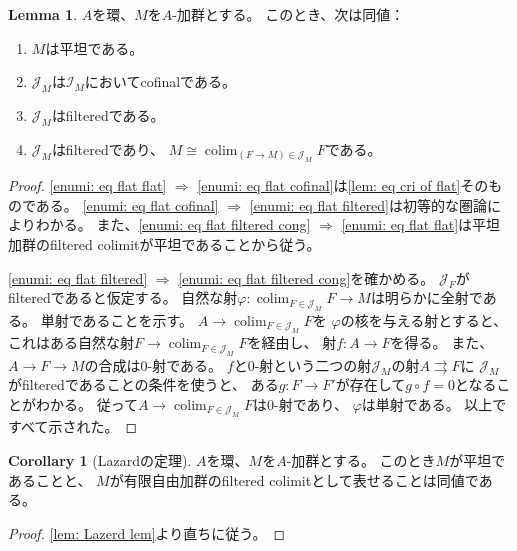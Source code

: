 \documentclass[uplatex]{jsarticle}
\theoremstyle{definition}
\newtheorem{cor}[cor]{Corollary}
\newtheorem{lem}[lem]{Lemma}
\DeclareMathOperator{\colim}{\mathrm{colim}}
\newcommand{\mcI}{\mathcal{I}}
\newcommand{\mcJ}{\mathcal{J}}
\begin{document}
\begin{lem}\label{lem: Lazerd lem}
  \(A\)を環、\(M\)を\(A\)-加群とする。
  このとき、次は同値：
  \begin{enumerate}
    \item \label{enumi: eq flat flat}
    \(M\)は平坦である。
    \item \label{enumi: eq flat cofinal}
    \(\mcJ_M\)は\(\mcI_M\)においてcofinalである。
    \item \label{enumi: eq flat filtered}
    \(\mcJ_M\)はfilteredである。
    \item \label{enumi: eq flat filtered cong}
    \(\mcJ_M\)はfilteredであり、
    \(M\cong \colim _{(F\to M)\in \mcJ_M}F\)である。
  \end{enumerate}
\end{lem}

\begin{proof}
  \ref{enumi: eq flat flat} \(\Rightarrow\)
  \ref{enumi: eq flat cofinal}は\autoref{lem: eq cri of flat}そのものである。
  \ref{enumi: eq flat cofinal} \(\Rightarrow\)
  \ref{enumi: eq flat filtered}は初等的な圏論によりわかる。
  また、\ref{enumi: eq flat filtered cong} \(\Rightarrow\)
  \ref{enumi: eq flat flat}は平坦加群のfiltered colimitが平坦であることから従う。

  \ref{enumi: eq flat filtered} \(\Rightarrow\)
  \ref{enumi: eq flat filtered cong}を確かめる。
  \(\mcJ_F\)がfilteredであると仮定する。
  自然な射\(\varphi:\colim_{F\in \mcJ_M}F\to M\)は明らかに全射である。
  単射であることを示す。
  \(A\to \colim_{F\in\mcJ_M}F\)を
  \(\varphi\)の核を与える射とすると、
  これはある自然な射\(F\to \colim_{F\in\mcJ_M}F\)を経由し、
  射\(f:A\to F\)を得る。
  また、\(A\to F\to M\)の合成は\(0\)-射である。
  \(f\)と\(0\)-射という二つの射\(\mcJ_M\)の射\(A\rightrightarrows F\)に
  \(\mcJ_M\)がfilteredであることの条件を使うと、
  ある\(g:F\to F'\)が存在して\(g\circ f=0\)となることがわかる。
  従って\(A\to \colim_{F\in\mcJ_M}F\)は\(0\)-射であり、
  \(\varphi\)は単射である。
  以上ですべて示された。
\end{proof}



\begin{cor}[Lazardの定理]
  \(A\)を環、\(M\)を\(A\)-加群とする。
  このとき\(M\)が平坦であることと、
  \(M\)が有限自由加群のfiltered colimitとして表せることは同値である。
\end{cor}

\begin{proof}
  \autoref{lem: Lazerd lem}より直ちに従う。
\end{proof}
\end{document}
